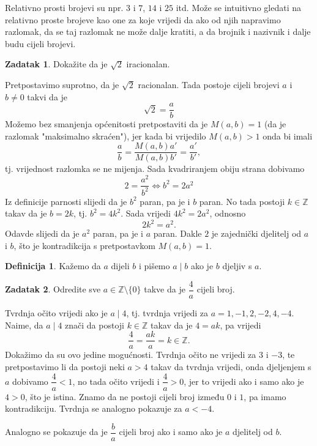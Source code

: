 \documentclass{book}
\renewenvironment{proof}{%
    \vspace{-\parskip}\begin{oldproof}%
    }{%
    \end{oldproof}%
}
\theoremstyle{definition}
\theoremstyle{definition}
\newtheorem{definition}{Definicija}
\newtheorem{exercise}{Zadatak}
\theoremstyle{remark}
\begin{document}
Relativno prosti brojevi su npr. $3$ i $7$, $14$ i $25$ itd. Može se intuitivno gledati na relativno proste brojeve kao one za koje vrijedi da ako od njih napravimo razlomak, da se taj razlomak ne može dalje kratiti, a da brojnik i nazivnik i dalje budu cijeli brojevi.

\begin{exercise}
Dokažite da je $\sqrt{2}$ iracionalan.
\end{exercise}
\begin{proof}[Rješenje]
Pretpostavimo suprotno, da je $\sqrt{2}$ racionalan. Tada postoje cijeli brojevi $a$ i $b\neq 0$ takvi da je
$$\sqrt{2}=\dfrac{a}{b}$$
Možemo bez smanjenja općenitosti pretpostaviti da je $M(a, b)=1$ (da je razlomak "maksimalno skraćen"), jer kada bi vrijedilo $M(a, b)>1$ onda bi imali
$$\dfrac{a}{b}=\dfrac{M(a, b)a'}{M(a, b)b'}=\dfrac{a'}{b'},$$
tj. vrijednost razlomka se ne mijenja. Sada kvadriranjem obiju strana dobivamo
$$2=\dfrac{a^2}{b^2}\Leftrightarrow b^2=2a^2$$
Iz definicije parnosti slijedi da je $b^2$ paran, pa je i $b$ paran. No tada postoji $k\in \mathbb{Z}$ takav da je $b=2k$, tj. $b^2=4k^2$. Sada vrijedi $4k^2=2a^2$, odnosno $$2k^2=a^2.$$ Odavde slijedi da je $a^2$ paran, pa je i $a$ paran. Dakle $2$ je zajednički djelitelj od $a$ i $b$, što je kontradikcija s pretpostavkom $M(a, b)=1$.
\end{proof}

\begin{definition}
Kažemo da $a$ dijeli $b$ i pišemo $a\; \vert \;b$ ako je $b$ djeljiv s $a$.
\end{definition}

\begin{exercise}
Odredite sve $a\in \mathbb{Z}\setminus \{0\}$ takve da je $\dfrac{4}{a}$ cijeli broj.
\end{exercise}
\begin{proof}[Rješenje]
Tvrdnja očito vrijedi ako je $a\; \vert \;4$, tj. tvrdnja vrijedi za $a=1, -1, 2, -2, 4, -4$. Naime, da $a\; \vert \;4$ znači da postoji $k\in \mathbb{Z}$ takav da je $4=ak$, pa vrijedi $$\dfrac{4}{a}=\dfrac{ak}{a}=k\in \mathbb{Z}.$$ Dokažimo da su ovo jedine mogućnosti. Tvrdnja očito ne vrijedi za $3$ i $-3$, te pretpostavimo li da postoji neki $a>4$ takav da tvrdnja vrijedi, onda djeljenjem s $a$ dobivamo $\dfrac{4}{a}<1$, no tada očito vrijedi i $\dfrac{4}{a}>0$, jer to vrijedi ako i samo ako je $4>0$, što je istina. Znamo da ne postoji cijeli broj između $0$ i $1$, pa imamo kontradikciju. Tvrdnja se analogno pokazuje za $a<-4$.
\end{proof}
Analogno se pokazuje da je $\dfrac{b}{a}$ cijeli broj ako i samo ako je $a$ djelitelj od $b$.
\end{document}
